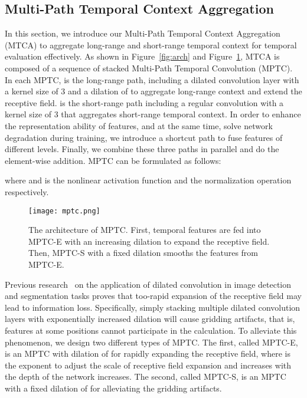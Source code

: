 \documentclass[letterpaper]{article} \usepackage{aaai22}  \usepackage{times}  \usepackage{helvet}  \usepackage{courier}  \usepackage[hyphens]{url}  \usepackage{graphicx} \urlstyle{rm} \def\UrlFont{\rm}  \usepackage{natbib}  \usepackage{caption} \DeclareCaptionStyle{ruled}{labelfont=normalfont,labelsep=colon,strut=off} \frenchspacing  \setlength{\pdfpagewidth}{8.5in}  \setlength{\pdfpageheight}{11in}  \usepackage{algorithm}
\begin{document}
\subsection{Multi-Path Temporal Context Aggregation} 






In this section, we introduce our Multi-Path Temporal Context Aggregation (MTCA) to aggregate long-range and short-range temporal context for temporal evaluation effectively.
As shown in Figure~\ref{fig:arch} and Figure~\ref{fig:mptc}, MTCA is composed of a sequence of stacked Multi-Path Temporal Convolution (MPTC).
In each MPTC,  is the long-range path, including a dilated convolution layer with a kernel size of 3 and a dilation of  to aggregate long-range context and extend the receptive field. 
 is the short-range path including a regular convolution with a kernel size of 3 that aggregates short-range temporal context.
In order to enhance the representation ability of features, and at the same time, solve network degradation during training, we introduce a shortcut path to fuse features of different levels.
Finally, we combine these three paths in parallel and do the element-wise addition.
MPTC can be formulated as follows:

where  and  is the nonlinear activation function and the normalization operation respectively.


\begin{figure}[!t]
  \texttt{[image: mptc.png]}
  \caption{The architecture of MPTC. First, temporal features are fed into MPTC-E with an increasing dilation to expand the receptive field. Then, MPTC-S with a fixed dilation smooths the features from MPTC-E.}
  \label{fig:mptc}
\end{figure}




Previous research~\cite{hdc} on the application of dilated convolution in image detection and segmentation tasks proves that too-rapid expansion of the receptive field may lead to information loss.
Specifically, simply stacking multiple dilated convolution layers with exponentially increased dilation will cause gridding artifacts, that is, features at some positions cannot participate in the calculation.
To alleviate this phenomenon, we design two different types of MPTC. 
The first, called MPTC-E, is an MPTC with dilation of  for rapidly expanding the receptive field, where  is the exponent to adjust the scale of receptive field expansion and increases with the depth of the network increases. 
The second, called MPTC-S, is an MPTC with a fixed dilation of  for alleviating the gridding artifacts.
\end{document}
